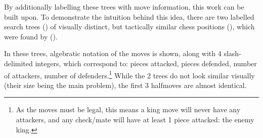 By additionally labelling these trees with move information, this work can be
built upon. To demonstrate the intuition behind this idea, there are two
labelled search trees () of visually distinct, but tactically
similar chess positions (), which were found by
\citet{chessLanguage} (). 

In these trees, algebratic notation of the moves is shown, along with 4
slash-delimited integers, which correspond to: pieces attacked, pieces
defended, number of attackers, number of defenders.\footnote{As the moves must
be legal, this means a king move will never have any attackers, and any
check/mate will have at least 1 piece attacked: the enemy king.} While the 2
trees do not look similar visually (their size being the main problem), the
first 3 halfmoves are almost identical. 


